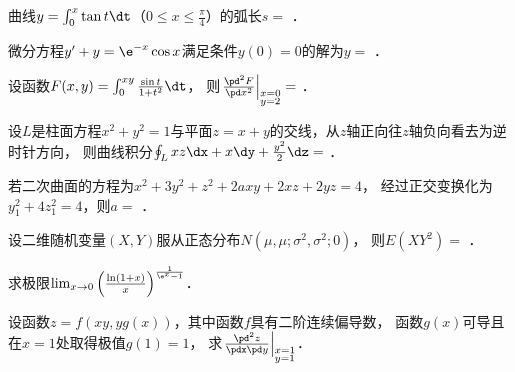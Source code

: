 \documentclass[plain,noanswer,medmath]{../../template/jnuexam}
\begin{document}


\begin{problem}
曲线$y = \int_0^x \tan t\dt$（$0 \le x \le \frac{\pi}{4}$）的弧长$s =$ \fillin{}．
\end{problem}


\begin{problem}
微分方程$y' + y = \e^{- x}\cos x$满足条件$y(0) = 0$的解为$y =$ \fillin{}．
\end{problem}


\begin{problem}
设函数$F(x,y) = \int_0^{xy} \frac{\sin t}{1 + t^2}\dt$，
则$\left. \frac{\pd^2 F}{\pd x^2} \right|_{\begin{subarray}{l}
  x = 0 \\
  y = 2
\end{subarray}} =$ \fillin{}．
\end{problem}


\begin{problem}
设$L$是柱面方程$x^2 + y^2 = 1$与平面$z = x + y$的交线，从$z$轴正向往$z$轴负向看去为逆时针方向，
则曲线积分$\oint_L xz\dx + x\dy + \frac{y^2}{2}\dz =$ \fillin{}．
\end{problem}


\begin{problem}
若二次曲面的方程为$x^2 + 3y^2 + z^2 + 2axy + 2xz + 2yz = 4$，
经过正交变换化为$y_1^2 + 4z_1^2 = 4$，则$a =$ \fillin{}．
\end{problem}


\begin{problem}
设二维随机变量$(X,Y)$服从正态分布$N\left(\mu,\mu;\sigma^2,\sigma^2;0\right)$，
则$E\left(XY^2\right) =$ \fillin{}．
\end{problem}




\begin{problem}[points=10]
求极限$\lim_{x \to 0} \left(\frac{\ln(1 + x)}{x} \right)^{\frac{1}{\e^x - 1}}$．
\end{problem}


\begin{problem}[points=9]
设函数$z = f(xy,yg(x))$，其中函数$f$具有二阶连续偏导数，
函数$g(x)$可导且在$x = 1$处取得极值$g(1) = 1$，
求$\left. \frac{\pd^2 z}{\pdx\pd y} \right|_{\begin{subarray}{l}
  x = 1 \\
  y = 1
\end{subarray}}$．
\end{problem}
\end{document}
